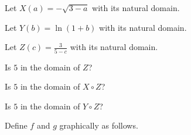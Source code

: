 \documentclass{ximera}
\begin{document}
\begin{example}


Let $X(a) = -\sqrt{3 - a}$ with its natural domain.


Let $Y(b) = \ln(1 + b)$ with its natural domain.


Let $Z(c) = \frac{3}{5 - c}$ with its natural domain.



\begin{question}

Is $5$ in the domain of $Z$?

\begin{multipleChoice}
\end{multipleChoice}

\end{question}





\begin{question}

Is $5$ in the domain of $X \circ Z$?

\begin{multipleChoice}
\end{multipleChoice}

\end{question}



\begin{question}

Is $5$ in the domain of $Y \circ Z$?

\begin{multipleChoice}
\end{multipleChoice}

\end{question}




\end{example}








Define $f$ and $g$ graphically as follows.
\end{document}
